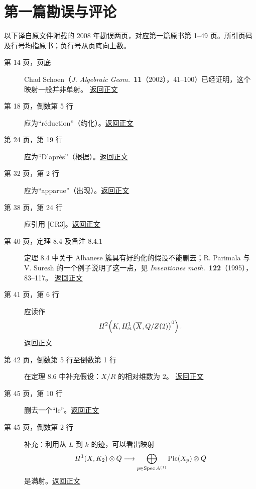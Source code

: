 \chapter*{第一篇勘误与评论}
\label{errata-ct}
\noindent\textcolor{Muted}{以下译自原文件附载的 2008 年勘误两页，对应第一篇原书第 1--49 页。所引页码及行号均指原书；负行号从页底向上数。}

\begin{description}
\item[第 14 页，页底]
Chad Schoen（\emph{J. Algebraic Geom.}\ \textbf{11}（2002），41--100）已经证明，这个映射一般并非单射。
\hfill\hyperref[orig:19]{返回正文}

\item[第 18 页，倒数第 5 行]
应为“réduction”（约化）。\hfill\hyperref[orig:23]{返回正文}

\item[第 24 页，第 19 行]
应为“D'après”（根据）。\hfill\hyperref[orig:29]{返回正文}

\item[第 32 页，第 2 行]
应为“apparue”（出现）。\hfill\hyperref[orig:37]{返回正文}

\item[第 38 页，第 24 行]
应引用 [CR3]。\hfill\hyperref[orig:43]{返回正文}

\item[第 40 页，定理 8.4 及备注 8.4.1]
定理 8.4 中关于 Albanese 簇具有好约化的假设不能删去；R. Parimala 与 V. Suresh 的一个例子说明了这一点，见 \emph{Inventiones math.}\ \textbf{122}（1995），83--117。
\hfill\hyperref[orig:45]{返回正文}

\item[第 41 页，第 6 行]
应读作
\[
 H^2\!\left(K,H^1_{\mathrm{\acute et}}\!\left(\overline X,Q/Z(2)\right)^0\right).
\]
\hfill\hyperref[orig:46]{返回正文}

\item[第 42 页，倒数第 5 行至倒数第 1 行]
在定理 8.6 中补充假设：$X/R$ 的相对维数为 $2$。
\hfill\hyperref[orig:47]{返回正文}

\item[第 45 页，第 10 行]
删去一个“le”。\hfill\hyperref[orig:50]{返回正文}

\item[第 45 页，倒数第 2 行]
补充：利用从 $L$ 到 $k$ 的迹，可以看出映射
\[
 H^1(X,K_2)\otimes Q
 \longrightarrow
 \bigoplus_{p\in\operatorname{Spec} A^{(1)}}\operatorname{Pic}(X_p)\otimes Q
\]
是满射。\hfill\hyperref[orig:50]{返回正文}


\end{description}
